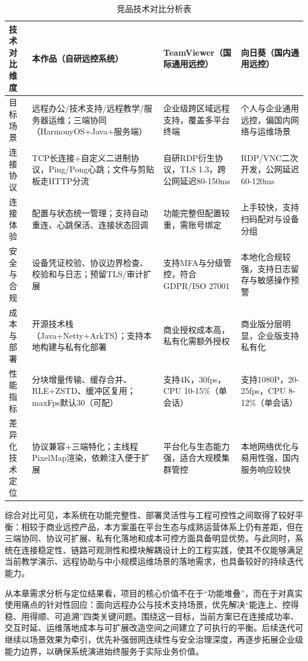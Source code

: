 \documentclass[UTF8,fontset=none]{ctexart}
\begin{document}
\begin{table}[H]
\centering
\caption{竞品技术对比分析表}
\small
\setlength{\tabcolsep}{3pt}
\renewcommand{\arraystretch}{1.2}
\begin{tabular}{L{2.4cm}L{3.9cm}L{3.9cm}L{3.9cm}}
\toprule
技术对比维度 & 本作品（自研远控系统） & TeamViewer（国际通用远控） & 向日葵（国内通用远控） \\
\midrule
目标场景 & 远程办公/技术支持/远程教学/服务器运维；三端协同（HarmonyOS+Java+服务端） & 企业级跨区域远程支持，覆盖多平台终端 & 个人与企业通用远控，偏国内网络与运维场景 \\
连接协议 & TCP长连接+自定义二进制协议，Ping/Pong心跳；文件与剪贴板走HTTP分流 & 自研RDP衍生协议，TLS 1.3，跨公网延迟80-150ms & RDP/VNC二次开发，公网延迟60-120ms \\
连接体验 & 配置与状态统一管理；支持自动重连、心跳保活、连接状态回调 & 功能完整但配置较重，需账号绑定 & 上手较快，支持扫码配对与设备分组 \\
安全与合规 & 设备凭证校验、协议边界检查、校验和与日志；预留TLS/审计扩展 & 支持MFA与分级管控，符合GDPR/ISO 27001 & 本地化合规较强，支持日志留存与敏感操作预警 \\
成本与部署 & 开源技术栈（Java+Netty+ArkTS）；支持本地构建与私有化部署 & 商业授权成本高，私有化需额外授权 & 商业版分层明显，企业版支持私有化 \\
性能指标 & 分块增量传输、缓存合并、RLE+ZSTD、缓冲区复用；maxFps默认30（可配） & 支持4K，30fps，CPU 10-15\%（单会话） & 支持1080P，20-25fps，CPU 8-12\%（单会话） \\
差异化技术定位 & 协议兼容+三端特化；主线程PixelMap渲染，依赖注入便于扩展 & 平台化与生态能力强，适合大规模集群管控 & 本地网络优化与易用性强，国内服务响应较快 \\
\bottomrule
\end{tabular}
\end{table}

综合对比可见，本系统在功能完整性、部署灵活性与工程可控性之间取得了较好平衡：相较于商业远控产品，本方案虽在平台生态与成熟运营体系上仍有差距，但在三端协同、协议可扩展、私有化落地和成本可控方面具备明显优势。与此同时，系统在连接稳定性、链路可观测性和模块解耦设计上的工程实践，使其不仅能够满足当前教学演示、远程协助与中小规模运维场景的落地需求，也具备较好的持续迭代能力。

从本章需求分析与定位结果看，项目的核心价值不在于“功能堆叠”，而在于对真实使用痛点的针对性回应：面向远程办公与技术支持场景，优先解决“能连上、控得稳、用得顺、可追溯”四类关键问题。围绕这一目标，当前方案已在连接成功率、交互时延、运维落地成本与可扩展改造空间之间建立了可执行的平衡。后续迭代可继续以场景效果为牵引，优先补强弱网连续性与安全治理深度，再逐步拓展企业级能力边界，以确保系统演进始终服务于实际业务价值。
\end{document}
